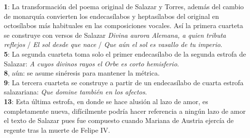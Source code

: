 \noindent \textbf{1}: La transformación del poema original de Salazar y Torres, además del cambio de monarquía convierten los endecasílabos y heptasílabos del original en octosílabos más habituales en las composiciones vocales. Así la primera cuarteta se construye con versos de Salazar \textit{Divina aurora Alemana, a quien tributa reflejos} / \textit{El sol desde que nace} / \textit{Que aún el sol es vasallo de tu imperio}.\\
\textbf{5}: La segunda cuarteta toma solo el primer endecasílabo de la segunda estrofa de Salazar: \textit{A cuyos divinos rayos el Orbe es corto hemisferio}.\\
\textbf{8}, aún: se asume sinéresis para mantener la métrica.\\
\textbf{9}: La tercera cuarteta se construye a partir de un endecasílabo de cuarta estrofa salazariana: \textit{Que domine también en los afectos}.\\
\textbf{13}: Esta última estrofa, en donde se hace alusión al lazo de amor, es completamente nueva, difícilmente podría hacer referencia a ningún lazo de amor el texto de Salazar pues fue compuesto cuando Mariana de Austria ejercía de regente tras la muerte de Felipe IV.



